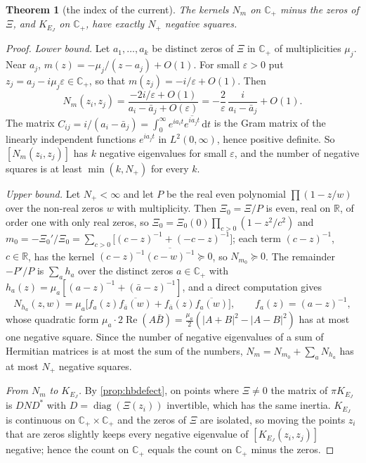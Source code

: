 \documentclass[11pt]{article}
\newtheorem{theorem}{Theorem}[section]
\theoremstyle{definition}\newtheorem{definition}[theorem]{Definition}
\theoremstyle{remark}\newtheorem{remark}[theorem]{Remark}
\newcommand{\R}{\mathbb R}\newcommand{\C}{\mathbb C}\newcommand{\N}{\mathbb N}
\newcommand{\dd}{\,\mathrm d}\newcommand{\e}{\mathrm e}
\renewcommand{\Re}{\operatorname{Re}}\renewcommand{\Im}{\operatorname{Im}}
\begin{document}
\begin{theorem}[the index of the current]\label{thm:index}
The kernels $N_m$ on $\C_+$ minus the zeros of $\Xi$, and $K_{E_J}$ on $\C_+$, have exactly $N_+$ negative squares.
\end{theorem}
\begin{proof}
\emph{Lower bound.} Let $a_1,\dots,a_k$ be distinct zeros of $\Xi$ in $\C_+$ of multiplicities $\mu_j$. Near $a_j$, $m(z)=-\mu_j/(z-a_j)+O(1)$. For small $\varepsilon>0$ put $z_j=a_j-i\mu_j\varepsilon\in\C_+$, so that $m(z_j)=-i/\varepsilon+O(1)$. Then
\[
N_m(z_i,z_j)=\frac{-2i/\varepsilon+O(1)}{a_i-\bar a_j+O(\varepsilon)}=-\frac2\varepsilon\,\frac{i}{a_i-\bar a_j}+O(1).
\]
The matrix $C_{ij}=i/(a_i-\bar a_j)=\int_0^\infty e^{ia_it}\overline{e^{ia_jt}}\dd t$ is the Gram matrix of the linearly independent functions $e^{ia_jt}$ in $L^2(0,\infty)$, hence positive definite. So $[N_m(z_i,z_j)]$ has $k$ negative eigenvalues for small $\varepsilon$, and the number of negative squares is at least $\min(k,N_+)$ for every $k$.

\emph{Upper bound.} Let $N_+<\infty$ and let $P$ be the real even polynomial $\prod(1-z/w)$ over the non-real zeros $w$ with multiplicity. Then $\Xi_0=\Xi/P$ is even, real on $\R$, of order one with only real zeros, so $\Xi_0=\Xi_0(0)\prod_{c>0}(1-z^2/c^2)$ and $m_0=-\Xi_0'/\Xi_0=\sum_{c>0}\bigl[(c-z)^{-1}+(-c-z)^{-1}\bigr]$; each term $(c-z)^{-1}$, $c\in\R$, has the kernel $(c-z)^{-1}\overline{(c-w)^{-1}}\succeq0$, so $N_{m_0}\succeq0$. The remainder $-P'/P$ is $\sum_ah_a$ over the distinct zeros $a\in\C_+$ with $h_a(z)=\mu_a[(a-z)^{-1}+(\bar a-z)^{-1}]$, and a direct computation gives
\[
N_{h_a}(z,w)=\mu_a\bigl[f_a(z)\overline{f_{\bar a}(w)}+f_{\bar a}(z)\overline{f_a(w)}\bigr],\qquad f_a(z)=(a-z)^{-1},
\]
whose quadratic form $\mu_a\cdot2\Re(A\bar B)=\frac{\mu_a}2(|A+B|^2-|A-B|^2)$ has at most one negative square. Since the number of negative eigenvalues of a sum of Hermitian matrices is at most the sum of the numbers, $N_m=N_{m_0}+\sum_aN_{h_a}$ has at most $N_+$ negative squares.

\emph{From $N_m$ to $K_{E_J}$.} By \cref{prop:hbdefect}, on points where $\Xi\ne0$ the matrix of $\pi K_{E_J}$ is $DN D^*$ with $D=\operatorname{diag}(\Xi(z_i))$ invertible, which has the same inertia. $K_{E_J}$ is continuous on $\C_+\times\C_+$ and the zeros of $\Xi$ are isolated, so moving the points $z_i$ that are zeros slightly keeps every negative eigenvalue of $[K_{E_J}(z_i,z_j)]$ negative; hence the count on $\C_+$ equals the count on $\C_+$ minus the zeros.
\end{proof}
\end{document}
